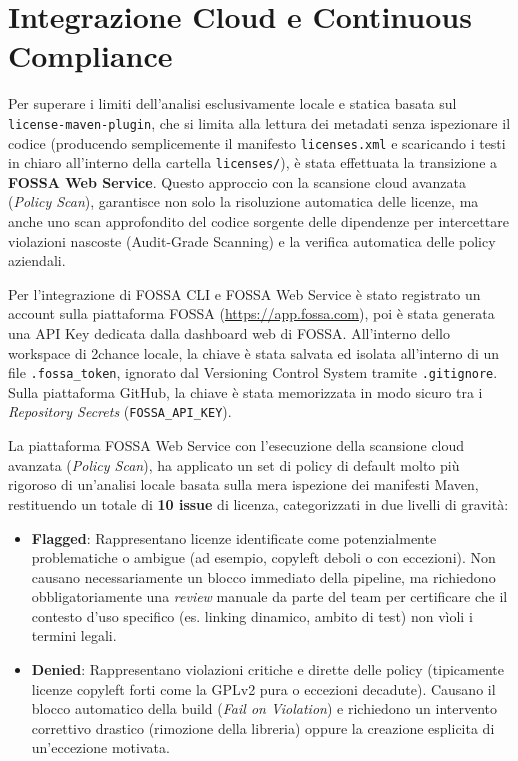 \section{Integrazione Cloud e Continuous Compliance}

Per superare i limiti dell'analisi esclusivamente locale e statica basata sul \texttt{license-maven-plugin}, che si limita alla lettura dei metadati senza ispezionare il codice (producendo semplicemente il manifesto \texttt{licenses.xml} e scaricando i testi in chiaro all'interno della cartella \texttt{licenses/}), è stata effettuata la transizione a \textbf{FOSSA Web Service}. Questo approccio con la scansione cloud avanzata (\textit{Policy Scan}), garantisce non solo la risoluzione automatica delle licenze, ma anche uno scan approfondito del codice sorgente delle dipendenze per intercettare violazioni nascoste (Audit-Grade Scanning) e la verifica automatica delle policy aziendali.

Per l'integrazione di FOSSA CLI e FOSSA Web Service è stato registrato un account sulla piattaforma FOSSA (\url{https://app.fossa.com}), poi è stata generata una API Key dedicata dalla dashboard web di FOSSA. All'interno dello workspace di 2chance locale, la chiave è stata salvata ed isolata all'interno di un file \texttt{.fossa\_token}, ignorato dal Versioning Control System tramite \texttt{.gitignore}. Sulla piattaforma GitHub, la chiave è stata memorizzata in modo sicuro tra i \textit{Repository Secrets} (\texttt{FOSSA\_API\_KEY}).

La piattaforma FOSSA Web Service con l'esecuzione della scansione cloud avanzata (\textit{Policy Scan}), ha applicato un set di policy di default molto più rigoroso di un'analisi locale basata sulla mera ispezione dei manifesti Maven, restituendo un totale di \textbf{10 issue} di licenza, categorizzati in due livelli di gravità:
\begin{itemize}
    \item \textbf{Flagged}: Rappresentano licenze identificate come potenzialmente problematiche o ambigue (ad esempio, copyleft deboli o con eccezioni). Non causano necessariamente un blocco immediato della pipeline, ma richiedono obbligatoriamente una \textit{review} manuale da parte del team per certificare che il contesto d'uso specifico (es. linking dinamico, ambito di test) non vìoli i termini legali.
    \item \textbf{Denied}: Rappresentano violazioni critiche e dirette delle policy (tipicamente licenze copyleft forti come la GPLv2 pura o eccezioni decadute). Causano il blocco automatico della build (\textit{Fail on Violation}) e richiedono un intervento correttivo drastico (rimozione della libreria) oppure la creazione esplicita di un'eccezione motivata.
\end{itemize}

